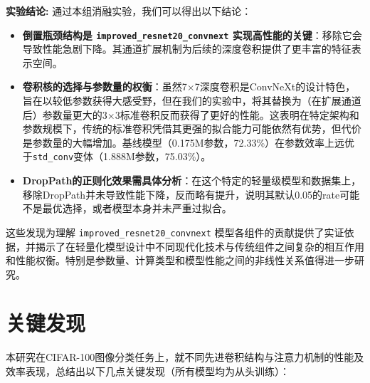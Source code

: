 \documentclass[a4paper]{article}
\begin{document}
\textbf{实验结论:}
通过本组消融实验，我们可以得出以下结论：
\begin{itemize}
    \item \textbf{倒置瓶颈结构是 \texttt{improved\_resnet20\_convnext} 实现高性能的关键}：移除它会导致性能急剧下降。其通道扩展机制为后续的深度卷积提供了更丰富的特征表示空间。
    \item \textbf{卷积核的选择与参数量的权衡}：虽然7×7深度卷积是ConvNeXt的设计特色，旨在以较低参数获得大感受野，但在我们的实验中，将其替换为（在扩展通道后）参数量更大的3×3标准卷积反而获得了更好的性能。这表明在特定架构和参数规模下，传统的标准卷积凭借其更强的拟合能力可能依然有优势，但代价是参数量的大幅增加。基线模型（0.175M参数，72.33\%）在参数效率上远优于\texttt{std\_conv}变体（1.888M参数，75.03\%）。
    \item \textbf{DropPath的正则化效果需具体分析}：在这个特定的轻量级模型和数据集上，移除DropPath并未导致性能下降，反而略有提升，说明其默认0.05的rate可能不是最优选择，或者模型本身并未严重过拟合。
\end{itemize}
这些发现为理解 \texttt{improved\_resnet20\_convnext} 模型各组件的贡献提供了实证依据，并揭示了在轻量化模型设计中不同现代化技术与传统组件之间复杂的相互作用和性能权衡。特别是参数量、计算类型和模型性能之间的非线性关系值得进一步研究。

\section{关键发现}
本研究在CIFAR-100图像分类任务上，就不同先进卷积结构与注意力机制的性能及效率表现，总结出以下几点关键发现（所有模型均为从头训练）：
\end{document}
